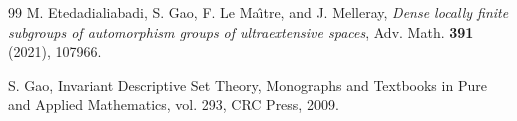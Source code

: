 \begin{thebibliography}{99}
M. Etedadialiabadi, S. Gao, F. Le Ma\^{\i}tre, and J. Melleray,
\textit{Dense locally finite subgroups of automorphism groups of ultraextensive spaces},
Adv. Math. {\bf 391} (2021), 107966.


S. Gao,
Invariant Descriptive Set Theory,
Monographs and Textbooks in Pure and Applied Mathematics, vol. 293,
CRC Press, 2009.

\end{thebibliography}
